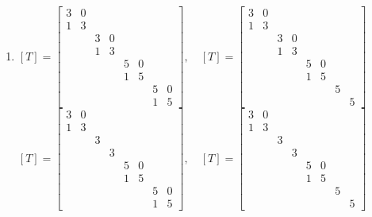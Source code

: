 \documentclass[12pt]{exam}
\begin{document}
\begin{exercicio}
\begin{solucao}
\begin{enumerate}[label=({\alph*})]
      \item $[T] = \begin{bmatrix}
        3 & 0\\
        1 & 3\\
        & & 3 & 0\\
        & & 1 & 3\\
        & & & & 5 & 0\\
        & & & & 1 & 5\\
        & & & & & & 5 & 0\\
        & & & & & & 1 & 5
      \end{bmatrix},\quad [T] = \begin{bmatrix}
        3 & 0\\
        1 & 3\\
        & & 3 & 0\\
        & & 1 & 3\\
        & & & & 5 & 0\\
        & & & & 1 & 5\\
        & & & & & & 5\\
        & & & & & & & 5
      \end{bmatrix}$\\
      $[T] = \begin{bmatrix}
        3 & 0\\
        1 & 3\\
        & & 3\\
        & & & 3\\
        & & & & 5 & 0\\
        & & & & 1 & 5\\
        & & & & & & 5 & 0\\
        & & & & & & 1 & 5
      \end{bmatrix},\quad [T] = \begin{bmatrix}
        3 & 0\\
        1 & 3\\
        & & 3\\
        & & & 3\\
        & & & & 5 & 0\\
        & & & & 1 & 5\\
        & & & & & & 5\\
        & & & & & & & 5
      \end{bmatrix}$
    \end{enumerate}
  \end{solucao}
\end{exercicio}
\end{document}
